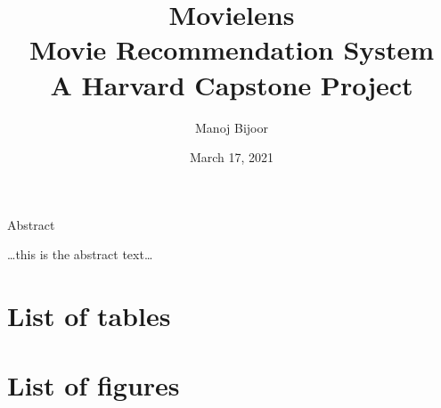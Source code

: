 \documentclass[
]{article}
\title{Movielens\\
Movie Recommendation System\\
A Harvard Capstone Project}
\author{Manoj Bijoor}
\date{March 17, 2021}
\begin{document}
\maketitle



\newpage

\newpage

\begin{center}

\hypertarget{Abstract}{}
\large{Abstract}

\end{center}

\bigskip

\ldots this is the abstract text\ldots{}

\newpage 
\clearpage
{}
\setcounter{secnumdepth}{5}
\setcounter{tocdepth}{5}

\cleardoublepage  \hypertarget{toc}{}
\bookmark[dest=toc,level=chapter]{\contentsname} \tableofcontents

\clearpage

\newpage
\clearpage
{}

\hypertarget{list-of-tables}{%
\section*{List of tables}\label{list-of-tables}}

\renewcommand{\listtablename}{}

\listoftables
\clearpage

\newpage
\clearpage
{}

\hypertarget{list-of-figures}{%
\section*{List of figures}\label{list-of-figures}}

\renewcommand{\listfigurename}{}

\listoffigures
\clearpage

\newpage
\clearpage
{}
\newcommand{\listequationsname}{List of Equations}
\newcommand{\equations}[1]{%
\refstepcounter{equations}
\addcontentsline{equ}{equations}{ \protect\numberline{\theequations}#1}\par}
\end{document}
